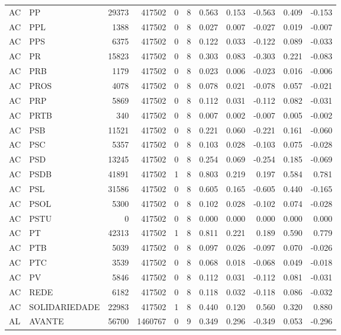 \begin{landscape}
\begin{longtable}{llrrrrrrrrr}
AC & PP & 29373 & 417502 & 0 & 8 & 0.563 & 0.153 & -0.563 & 0.409 & -0.153 \\
AC & PPL & 1388 & 417502 & 0 & 8 & 0.027 & 0.007 & -0.027 & 0.019 & -0.007 \\
AC & PPS & 6375 & 417502 & 0 & 8 & 0.122 & 0.033 & -0.122 & 0.089 & -0.033 \\
AC & PR & 15823 & 417502 & 0 & 8 & 0.303 & 0.083 & -0.303 & 0.221 & -0.083 \\
AC & PRB & 1179 & 417502 & 0 & 8 & 0.023 & 0.006 & -0.023 & 0.016 & -0.006 \\
AC & PROS & 4078 & 417502 & 0 & 8 & 0.078 & 0.021 & -0.078 & 0.057 & -0.021 \\
AC & PRP & 5869 & 417502 & 0 & 8 & 0.112 & 0.031 & -0.112 & 0.082 & -0.031 \\
AC & PRTB & 340 & 417502 & 0 & 8 & 0.007 & 0.002 & -0.007 & 0.005 & -0.002 \\
AC & PSB & 11521 & 417502 & 0 & 8 & 0.221 & 0.060 & -0.221 & 0.161 & -0.060 \\
AC & PSC & 5357 & 417502 & 0 & 8 & 0.103 & 0.028 & -0.103 & 0.075 & -0.028 \\
AC & PSD & 13245 & 417502 & 0 & 8 & 0.254 & 0.069 & -0.254 & 0.185 & -0.069 \\
AC & PSDB & 41891 & 417502 & 1 & 8 & 0.803 & 0.219 & 0.197 & 0.584 & 0.781 \\
AC & PSL & 31586 & 417502 & 0 & 8 & 0.605 & 0.165 & -0.605 & 0.440 & -0.165 \\
AC & PSOL & 5300 & 417502 & 0 & 8 & 0.102 & 0.028 & -0.102 & 0.074 & -0.028 \\
AC & PSTU & 0 & 417502 & 0 & 8 & 0.000 & 0.000 & 0.000 & 0.000 & 0.000 \\
AC & PT & 42313 & 417502 & 1 & 8 & 0.811 & 0.221 & 0.189 & 0.590 & 0.779 \\
AC & PTB & 5039 & 417502 & 0 & 8 & 0.097 & 0.026 & -0.097 & 0.070 & -0.026 \\
AC & PTC & 3539 & 417502 & 0 & 8 & 0.068 & 0.018 & -0.068 & 0.049 & -0.018 \\
AC & PV & 5846 & 417502 & 0 & 8 & 0.112 & 0.031 & -0.112 & 0.081 & -0.031 \\
AC & REDE & 6182 & 417502 & 0 & 8 & 0.118 & 0.032 & -0.118 & 0.086 & -0.032 \\
AC & SOLIDARIEDADE & 22983 & 417502 & 1 & 8 & 0.440 & 0.120 & 0.560 & 0.320 & 0.880 \\
AL & AVANTE & 56700 & 1460767 & 0 & 9 & 0.349 & 0.296 & -0.349 & 0.053 & -0.296 \\

\end{longtable}
\end{landscape}
